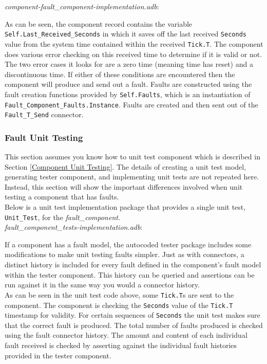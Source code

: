 \textit{component-fault\_component-implementation.adb}:

As can be seen, the component record contains the variable \texttt{Self.Last\_Received\_Seconds} in which it saves off the last received \texttt{Seconds} value from the system time contained within the received \texttt{Tick.T}. The component does various error checking on this received time to determine if it is valid or not. The two error cases it looks for are a zero time (meaning time has reset) and a discontinuous time. If either of these conditions are encountered then the component will produce and send out a fault. Faults are constructed using the fault creation functions provided by \texttt{Self.Faults}, which is an instantiation of \texttt{Fault\_Component\_Faults.Instance}. Faults are created and then sent out of the \texttt{Fault\_T\_Send} connector.

\subsubsection{Fault Unit Testing}

This section assumes you know how to unit test component which is described in Section \ref{Component Unit Testing}. The details of creating a unit test model, generating tester component, and implementing unit tests are not repeated here. Instead, this section will show the important differences involved when unit testing a component that has faults. \\

Below is a unit test implementation package that provides a single unit test, \texttt{Unit\_Test}, for the \textit{fault\_component}. \\

\textit{fault\_component\_tests-implementation.adb}:

If a component has a fault model, the autocoded tester package includes some modifications to make unit testing faults simpler. Just as with connectors, a distinct history is included for every fault defined in the component's fault model within the tester component. This history can be queried and assertions can be run against it in the same way you would a connector history. \\

As can be seen in the unit test code above, some \texttt{Tick.T}s are sent to the component. The component is checking the \texttt{Seconds} value of the \texttt{Tick.T} timestamp for validity. For certain sequences of \texttt{Seconds} the unit test makes sure that the correct fault is produced. The total number of faults produced is checked using the fault connector history. The amount and content of each individual fault received is checked by asserting against the individual fault histories provided in the tester component. \\

